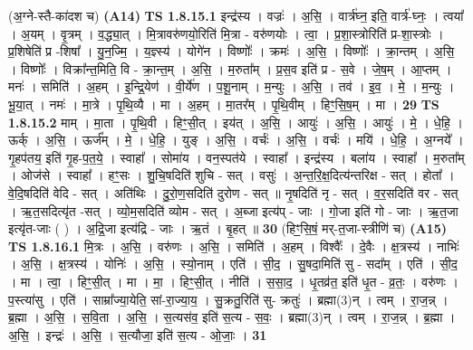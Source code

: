 \documentclass[17pt]{extarticle}
\begin{document}
                  \newline
                      (अ॒ग्ने-स्तै-का॑दश च)  \textbf{(A14)} \newline \newline
                                \textbf{ TS 1.8.15.1} \newline
                  इन्द्र॑स्य । वज्रः॑ । अ॒सि॒ । वार्त्र॑घ्न॒ इति॒ वार्त्र॑-घ्नः॒ । त्वया᳚ । अ॒यम् । वृ॒त्रम् । व॒द्ध्या॒त् । मि॒त्रावरु॑णयो॒रिति॑ मि॒त्रा - वरु॑णयोः । त्वा॒ । प्र॒शा॒स्त्रोरिति॑ प्र-शा॒स्त्रोः । प्र॒शिषेति॑ प्र -शिषा᳚ । यु॒न॒ज्मि॒ । य॒ज्ञ्स्य॑ । योगे॑न । विष्णोः᳚ । क्रमः॑ । अ॒सि॒ । विष्णोः᳚ । क्रा॒न्तम् । अ॒सि॒ । विष्णोः᳚ । विक्रा᳚न्त॒मिति॒ वि - क्रा॒न्त॒म् । अ॒सि॒ । म॒रुता᳚म् । प्र॒स॒व इति॑ प्र - स॒वे । जे॒ष॒म् । आ॒प्तम् । मनः॑ । समिति॑ । अ॒हम् । इ॒न्द्रि॒येण॑ । वी॒र्ये॑ण । प॒शू॒नाम् । म॒न्युः । अ॒सि॒ । तव॑ । इ॒व॒ । मे॒ । म॒न्युः । भू॒या॒त् । नमः॑ । मा॒त्रे । पृ॒थि॒व्यै । मा । अ॒हम् । मा॒तर᳚म् । पृ॒थि॒वीम् । हिꣳ॒॒सि॒ष॒म् । मा । \textbf{  29} \newline
                  \newline
                                \textbf{ TS 1.8.15.2} \newline
                  माम् । मा॒ता । पृ॒थि॒वी । हिꣳ॒॒सी॒त् । इय॑त् । अ॒सि॒ । आयुः॑ । अ॒सि॒ । आयुः॑ । मे॒ । धे॒हि॒ । ऊर्क् । अ॒सि॒ । ऊर्ज᳚म् । मे॒ । धे॒हि॒ । युङ् । अ॒सि॒ । वर्चः॑ । अ॒सि॒ । वर्चः॑ । मयि॑ । धे॒हि॒ । अ॒ग्नये᳚ । गृ॒हप॑तय॒ इति॑ गृ॒ह-प॒त॒ये॒ । स्वाहा᳚ । सोमा॑य । वन॒स्पत॑ये । स्वाहा᳚ । इन्द्र॑स्य । बला॑य । स्वाहा᳚ । म॒रुता᳚म् । ओज॑से । स्वाहा᳚ । हꣳ॒॒सः । शु॒चि॒षदिति॑ शुचि - सत् । वसुः॑ । अ॒न्त॒रि॒क्ष॒दित्य॑न्तरिक्ष - सत् । होता᳚ । वे॒दि॒षदिति॑ वेदि - सत् । अति॑थिः । दु॒रो॒ण॒सदिति॑ दुरोण - सत् ॥ नृ॒षदिति॑ नृ - सत् । व॒र॒सदिति॑ वर - सत् । ऋ॒त॒सदित्यृ॑त -सत् । व्यो॒म॒सदिति॑ व्योम - सत् । अ॒ब्जा इत्य॑प् - जाः । गो॒जा इति॑ गो - जाः । ऋ॒त॒जा इत्यृ॑त-जाः ( ) । अ॒द्रि॒जा इत्य॑द्रि - जाः । ऋ॒तं । बृ॒हत् ॥ \textbf{  30} \newline
                  \newline
                      (हिꣳ॒॒सि॒षं॒ मर्-त॒जा-स्त्रीणि॑ च)  \textbf{(A15)} \newline \newline
                                \textbf{ TS 1.8.16.1} \newline
                  मि॒त्रः । अ॒सि॒ । वरु॑णः । अ॒सि॒ । समिति॑ । अ॒हम् । विश्वैः᳚ । दे॒वैः । क्ष॒त्रस्य॑ । नाभिः॑ । अ॒सि॒ । क्ष॒त्रस्य॑ । योनिः॑ । अ॒सि॒ । स्यो॒नाम् । एति॑ । सी॒द॒ । सु॒षदा॒मिति॑ सु - सदा᳚म् । एति॑ । सी॒द॒ । मा । त्वा॒ । हिꣳ॒॒सी॒त् । मा । मा॒ । हिꣳ॒॒सी॒त् । नीति॑ । स॒सा॒द॒ । धृ॒तव्र॑त॒ इति॑ धृ॒त - व्र॒तः॒ । वरु॑णः । प॒स्त्या॑सु । एति॑ । साम्रा᳚ज्या॒येति॒ सां-रा॒ज्या॒य॒ । सु॒क्रतु॒रिति॑ सु- क्रतुः॑ । ब्रह्मा(3)न् । त्वम् । रा॒ज॒न्न् । ब्र॒ह्मा । अ॒सि॒ । स॒वि॒ता । अ॒सि॒ । स॒त्यस॑व॒ इति॑ स॒त्य - स॒वः॒ । ब्रह्मा(3)न् । त्वम् । रा॒ज॒न्न् । ब्र॒ह्मा । अ॒सि॒ । इन्द्रः॑ । अ॒सि॒ । स॒त्यौजा॒ इति॑ स॒त्य - ओ॒जाः॒ । \textbf{  31} \newline
\end{document}
